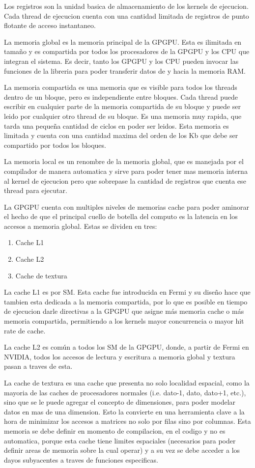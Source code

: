 Los registros son la unidad basica de almacenamiento de los kernels de ejecucion.
Cada thread de ejecucion cuenta con una cantidad limitada de registros de punto flotante de
acceso instantaneo.

La memoria global es la memoria principal de la GPGPU. Esta es ilimitada en tama\~no
y es compartida por todos los procesadores de la GPGPU y los CPU que integran el
sistema. Es decir, tanto los GPGPU y los CPU pueden invocar las funciones de la libreria
para poder transferir datos de y hacia la memoria RAM.

La memoria compartida es una memoria que es visible para todos los threads dentro
de un bloque, pero es independiente entre bloques. Cada thread puede escribir en cualquier
parte de la memoria compartida de su bloque y puede ser leido por cualquier otro thread
de su bloque. Es una memoria muy rapida, que tarda una peque\~na cantidad de ciclos
en poder ser leidos. Esta memoria es limitada y cuenta con una cantidad maxima del orden de los
Kb que debe ser compartido por todos los bloques.

La memoria local es un renombre de la memoria global, que es manejada por el compilador
de manera automatica y sirve para poder tener mas memoria interna al kernel de ejecucion
pero que sobrepase la cantidad de registros que cuenta ese thread para ejecutar.

La GPGPU cuenta con multiples niveles de memorias cache para poder aminorar el hecho
de que el principal cuello de botella del computo es la latencia en los accesos a memoria
global. Estas se dividen en tres:

\begin{enumerate}
  \item Cache L1
  \item Cache L2
  \item Cache de textura
\end{enumerate}

La cache L1 es por SM. Esta cache fue introducida en Fermi y su dise\~no hace que
tambien esta dedicada a la memoria compartida, por lo que es posible en tiempo de ejecucion
darle directivas a la GPGPU que asigne m\'as memoria cache o m\'as memoria compartida,
permitiendo a los kernels mayor concurrencia o mayor hit rate de cache.

La cache L2 es com\'un a todos los SM de la GPGPU, donde, a partir de Fermi en NVIDIA, todos
los accesos de lectura y escritura a memoria global y textura pasan a traves de esta.

La cache de textura es una cache que presenta no solo localidad espacial, como la mayoria
de las caches de procesadores normales (i.e. dato-1, dato, dato+1, etc.), sino que se le
puede agregar el concepto de dimensiones, para poder modelar datos en mas de una dimension.
Esto la convierte en una herramienta clave a la hora de minimizar los accesos a matrices
no solo por filas sino por columnas. Esta memoria se debe definir en momento de compilacion,
en el codigo y no es automatica, porque esta cache tiene limites espaciales (necesarios
para poder definir areas de memoria sobre la cual operar) y a su vez se debe acceder
a los dayos subyacentes a traves de funciones especificas.

